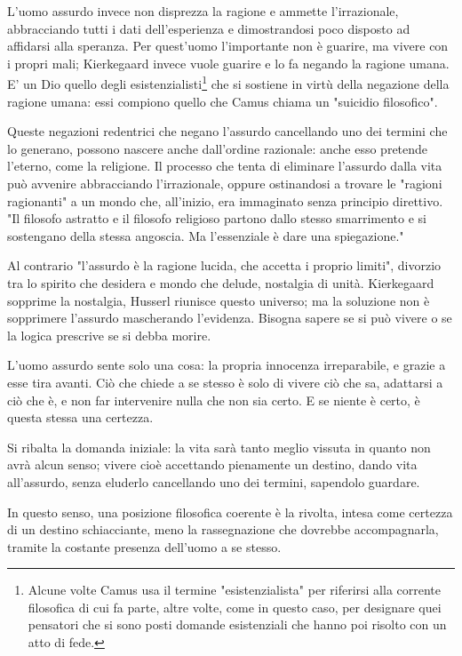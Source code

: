 \documentclass[a4paper,12pt,oneside]{article}%
\begin{document}
L'uomo assurdo invece non disprezza la ragione e ammette l'irrazionale, abbracciando tutti i dati dell'esperienza e dimostrandosi poco disposto ad affidarsi alla speranza. Per quest'uomo l'importante non è guarire, ma vivere con i propri mali; Kierkegaard invece vuole guarire e lo fa negando la ragione umana. E' un Dio quello degli esistenzialisti\footnote{Alcune volte Camus usa il termine "esistenzialista" per riferirsi alla corrente filosofica di cui fa parte, altre volte, come in questo caso, per designare quei pensatori che si sono posti domande esistenziali che hanno poi risolto con un atto di fede.} che si sostiene in virtù della negazione della ragione umana: essi compiono quello che Camus chiama un "suicidio filosofico".

Queste negazioni redentrici che negano l'assurdo cancellando uno dei termini che lo generano, possono nascere anche dall'ordine razionale: anche esso pretende l'eterno, come la religione. Il processo che tenta di eliminare l'assurdo dalla vita può avvenire abbracciando l'irrazionale, oppure ostinandosi a trovare le "ragioni ragionanti" a un mondo che, all'inizio, era immaginato senza principio direttivo. "Il filosofo astratto e il filosofo religioso partono dallo stesso smarrimento e si sostengano della stessa angoscia. Ma l'essenziale è dare una spiegazione."

Al contrario "l'assurdo è la ragione lucida, che accetta i proprio limiti", divorzio tra lo spirito che desidera e mondo che delude, nostalgia di unità. Kierkegaard sopprime la nostalgia, Husserl riunisce questo universo; ma la soluzione non è sopprimere l'assurdo mascherando l'evidenza. Bisogna sapere se si può vivere o se la logica prescrive se si debba morire.

L'uomo assurdo sente solo una cosa: la propria innocenza irreparabile, e grazie a esse tira avanti. Ciò che chiede a se stesso è solo di vivere ciò che sa, adattarsi a ciò che è, e non far intervenire nulla che non sia certo. E se niente è certo, è questa stessa una certezza.

Si ribalta la domanda iniziale: la vita sarà tanto meglio vissuta in quanto non avrà alcun senso; vivere cioè accettando pienamente un destino, dando vita all'assurdo, senza eluderlo cancellando uno dei termini, sapendolo guardare.

In questo senso, una posizione filosofica coerente è la rivolta, intesa come certezza di un destino schiacciante, meno la rassegnazione che dovrebbe accompagnarla, tramite la costante presenza dell'uomo a se stesso.
\end{document}
